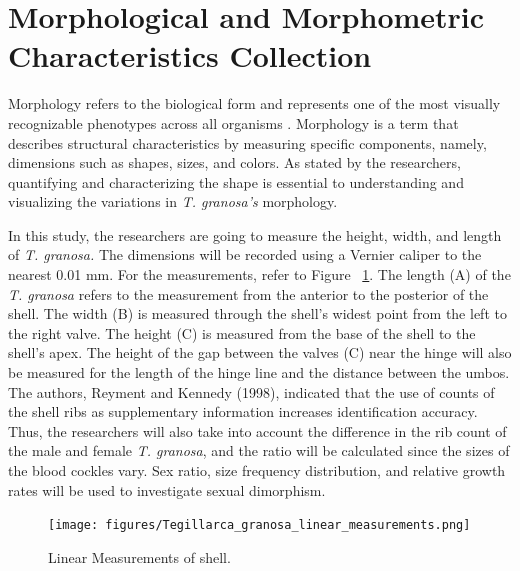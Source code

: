 \newpage
\section{Morphological and Morphometric Characteristics Collection}
\label{sec:morphochar}

Morphology refers to the biological form and represents one of the most visually recognizable phenotypes across all organisms \cite{tsutsumi2023}. Morphology is a term that describes structural characteristics by measuring specific components, namely, dimensions such as shapes, sizes, and colors. As stated by the researchers, quantifying and characterizing the shape is essential to understanding and visualizing the variations in \textit{T. granosa’s} morphology. 

In this study, the researchers are going to measure the height, width, and length of \textit{T. granosa.} The dimensions will be recorded using a Vernier caliper to the nearest 0.01 mm. For the measurements, refer to Figure ~\ref{fig:linear_measurements}. The length (A) of the \textit{T. granosa} refers to the measurement from the anterior to the posterior of the shell. The width (B) is measured through the shell’s widest point from the left to the right valve. The height (C) is measured from the base of the shell to the shell’s apex. The height of the gap between the valves (C) near the hinge will also be measured for the length of the hinge line and the distance between the umbos. The authors, Reyment and Kennedy (1998), indicated that the use of counts of the shell ribs as supplementary information increases identification accuracy. Thus, the researchers will also take into account the difference in the rib count of the male and female \textit{T. granosa}, and the ratio will be calculated since the sizes of the blood cockles vary. Sex ratio, size frequency distribution, and relative growth rates will be used to investigate sexual dimorphism.

\begin{figure}[!htbp]
	\centering
	\texttt{[image: figures/Tegillarca\_granosa\_linear\_measurements.png]}
	\caption{Linear Measurements of  \Tegillarcagranosa shell.}
	\label{fig:linear_measurements}
\end{figure}

